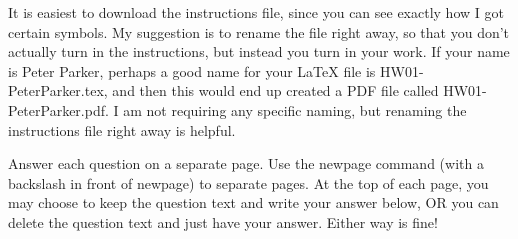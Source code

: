 \documentclass{article}
\begin{document}
It is easiest to download the instructions file, since you can see exactly how I got certain symbols. My suggestion is to rename the file right away, so that you don't actually turn in the instructions, but instead you turn in your work. If your name is Peter Parker, perhaps a good name for your LaTeX file is HW01-PeterParker.tex, and then this would end up created a PDF file called HW01-PeterParker.pdf. I am not requiring any specific naming, but renaming the instructions file right away is helpful.

Answer each question on a separate page. Use the newpage command (with a backslash in front of newpage) to separate pages. At the top of each page, you may choose to keep the question text and write your answer below, OR you can delete the question text and just have your answer. Either way is fine!

\end{document}
